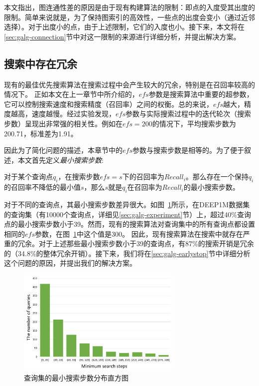 本文指出，图连通性差的原因是由于现有构建算法的限制：即点的入度受其出度的限制。简单来说就是，为了保持图索引的高效性，一些点的出度会变小（通过近邻选择）。对于出度小的点，由于上述限制，它们的入度也小。接下来，本文将在\ref{sec:galg-connection}节中对这一限制的来源进行详细分析，并提出解决方案。


\subsection{搜索中存在冗余}
现有的最佳优先搜索算法在搜索过程中会产生较大的冗余，特别是在召回率较高的情况下。
正如本文在上一章节中所介绍的，$efs$参数是搜索算法中重要的超参数，它可以控制搜索速度和搜索精度（召回率）之间的权衡。总的来说，$efs$越大，精度越高，速度越慢。经过实验发现，$efs$参数与实际搜索过程中的迭代轮次（搜索步数）呈现出非常强的相关性。例如在$efs=200$的情况下，平均搜索步数为200.71，标准差为1.91。

因此为了简化问题的描述，本章节中的$efs$参数与搜索步数是相等的。为了便于叙述，本文首先定义\textit{最小搜索步数}:

\begin{definition}[最小搜索步数]
对于某个查询点$q_i$，在搜索步数$efs=s$下的召回率为$Recall_i$。那么存在一个保持$q_i$的召回率不降低的最小值$s$，那么$s$就是$q_i$在召回率为$Recall_i$的最小搜索步数。
\end{definition}

对于不同的查询点，其最小搜索步数差异很大。如图~\ref{fig:steps-histogram}所示，在DEEP1M数据集的查询集（有10000个查询点，详细见\ref{sec:galg-experiment}节）上，超过40\%查询点的最小搜索步数小于39。然而，现有的搜索算法对查询集中的所有查询点都设置相同的$efs$参数，在图~\ref{fig:steps-histogram}中这个值是300。
因此，现有搜索算法在搜索中就存在严重的冗余。对于上述那些最小搜索步数小于39的查询点，有87\%的搜索开销是冗余的（34.8\%的整体冗余开销）。接下来，我们将在\ref{sec:galg-earlystop}节中详细分析这个问题的原因，并提出我们的解决方案。

\begin{figure}[htbp]
  \centering
  \includegraphics[width=0.7\textwidth]{figures/context-1/steps-histogram.pdf}
  \caption{查询集的最小搜索步数分布直方图}
  \label{fig:steps-histogram}
\end{figure}

